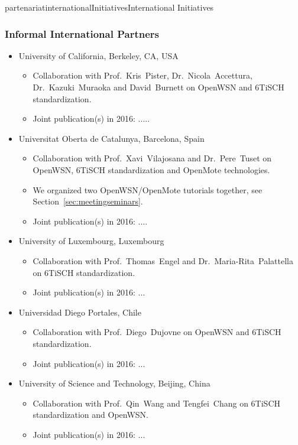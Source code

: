 \documentclass{ra2016}
\begin{document}
\begin{module}{partenariat}{internationalInitiatives}{International Initiatives}
	\subsubsection{Informal International Partners}
	\begin{itemize}
    
    \item University of California, Berkeley, CA, USA
        \begin{itemize}
            \item Collaboration with Prof.~Kris~Pister, Dr.~Nicola~Accettura, Dr.~Kazuki~Muraoka and David~Burnett on OpenWSN and 6TiSCH standardization.
            \item Joint publication(s) in 2016: .....
        \end{itemize}
    
    \item Universitat Oberta de Catalunya, Barcelona, Spain
        \begin{itemize}
            \item Collaboration with Prof.~Xavi~Vilajosana and Dr.~Pere~Tuset on OpenWSN, 6TiSCH standardization and OpenMote technologies.
            \item We organized two OpenWSN/OpenMote tutorials together, see Section~\ref{sec:meetingseminars}.
            \item Joint publication(s) in 2016: ....
        \end{itemize}
    
    \item University of Luxembourg, Luxembourg
        \begin{itemize}
            \item Collaboration with Prof.~Thomas~Engel and Dr.~Maria-Rita~Palattella on 6TiSCH standardization.
            \item Joint publication(s) in 2016: ...
        \end{itemize}
    
    \item Universidad Diego Portales, Chile
        \begin{itemize}
            \item Collaboration with Prof.~Diego~Dujovne on OpenWSN and 6TiSCH standardization.
            \item Joint publication(s) in 2016: ...
        \end{itemize}
    
    \item University of Science and Technology, Beijing, China
        \begin{itemize}
            \item Collaboration with Prof.~Qin~Wang and Tengfei~Chang on 6TiSCH standardization and OpenWSN.
            \item Joint publication(s) in 2016: ...
        \end{itemize}
    

\end{itemize}
\end{module}
\end{document}
